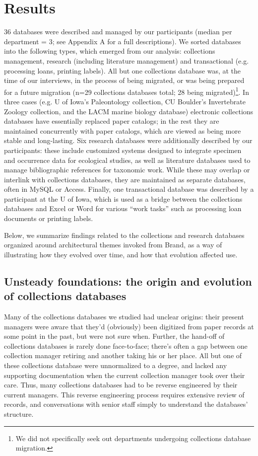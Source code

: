 \section{Results}

36 databases were described and managed by our participants (median per department = 3; see Appendix A for a full descriptions). We sorted databases into the following types, which emerged from our analysis: collections management, research (including literature management) and transactional (e.g. processing loans, printing labels). All but one collections database was, at the time of our interviews, in the process of being migrated, or was being prepared for a future migration (n=29 collections databases total; 28 being migrated)\footnote{We did not specifically seek out departments undergoing collections database migration.}. In three cases (e.g. U of Iowa’s Paleontology collection, CU Boulder’s Invertebrate Zoology collection, and the LACM marine biology database) electronic collections databases have essentially replaced paper catalogs; in the rest they are maintained concurrently with paper catalogs, which are viewed as being more stable and long-lasting. Six research databases were additionally described by our participants: these include customized systems designed to integrate specimen and occurrence data for ecological studies, as well as literature databases used to manage bibliographic references for taxonomic work. While these may overlap or interlink with collections databases, they are maintained as separate databases, often in MySQL or Access. Finally, one transactional database was described by a participant at the U of Iowa, which is used as a bridge between the collections databases and Excel or Word for various “work tasks” such as processing loan documents or printing labels. 

Below, we summarize findings related to the collections and research databases organized around architectural themes invoked from Brand, as a way of illustrating how they evolved over time, and how that evolution affected use.

\subsection{Unsteady foundations: the origin and evolution of collections databases}

Many of the collections databases we studied had unclear origins: their present managers were aware that they'd (obviously) been digitized from paper records at some point in the past, but were not sure when. Further, the hand-off of collections databases is rarely done face-to-face; there's often a gap between one collection manager retiring and another taking his or her place. All but one of these collections database were unnormalized to a degree, and lacked any supporting documentation when the current collection manager took over their care. Thus, many collections databases had to be reverse engineered by their current managers. This reverse engineering process requires extensive review of records, and conversations with senior staff simply to understand the databases’ structure. 

